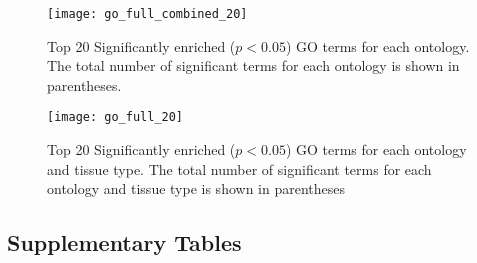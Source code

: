 \documentclass[11pt]{article}
\begin{document}
\begin{figure}[t]
  \centering
  \texttt{[image: go\_full\_combined\_20]}
  \caption{Top 20 Significantly enriched ($p < 0.05$) GO terms for
    each ontology. The total number of significant terms for each
    ontology is shown in parentheses.}
  \label{fig:go_combined}
\end{figure}


\begin{figure}[t]
  \centering
  \texttt{[image: go\_full\_20]}
  \caption{Top 20 Significantly enriched ($p < 0.05$) GO terms for
    each ontology and tissue type. The total number of significant
    terms for each ontology and tissue type is shown in parentheses}
  \label{fig:go_tissue}
\end{figure}
 
\clearpage

\subsection*{Supplementary Tables}\label{ss:supp-tab}
\scriptsize
  
\clearpage

\clearpage

\clearpage
  
\clearpage

\clearpage

\end{document}
